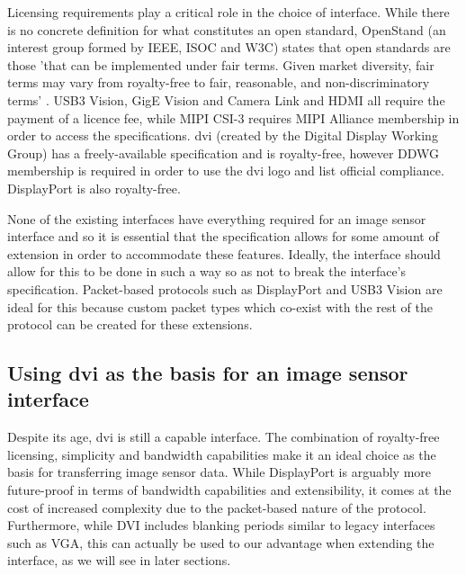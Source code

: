 Licensing requirements play a critical role in the choice of interface. While there is no concrete definition for what constitutes an open standard, OpenStand (an interest group formed by IEEE, ISOC and W3C) states that open standards are those 'that can be implemented under fair terms. Given market diversity, fair terms may vary from royalty-free to fair, reasonable, and non-discriminatory terms' \cite{open_standard_definition}. USB3 Vision, GigE Vision and Camera Link and HDMI all require the payment of a licence fee, while MIPI CSI-3 requires MIPI Alliance membership in order to access the specifications. \gls{dvi} (created by the Digital Display Working Group) has a freely-available specification and is royalty-free, however DDWG membership is required in order to use the \gls{dvi} logo and list official compliance. DisplayPort is also royalty-free.

None of the existing interfaces have everything required for an image sensor interface and so it is essential that the specification allows for some amount of extension in order to accommodate these features. Ideally, the interface should allow for this to be done in such a way so as not to break the interface's specification. Packet-based protocols such as DisplayPort and USB3 Vision are ideal for this because custom packet types which co-exist with the rest of the protocol can be created for these extensions. 

\subsection{Using \gls{dvi} as the basis for an image sensor interface}
Despite its age, \gls{dvi} is still a capable interface. The combination of royalty-free licensing, simplicity and bandwidth capabilities make it an ideal choice as the basis for transferring image sensor data. While DisplayPort is arguably more future-proof in terms of bandwidth capabilities and extensibility, it comes at the cost of increased complexity due to the packet-based nature of the protocol. Furthermore, while \gls{DVI} includes blanking periods similar to legacy interfaces such as VGA, this can actually be used to our advantage when extending the interface, as we will see in later sections.